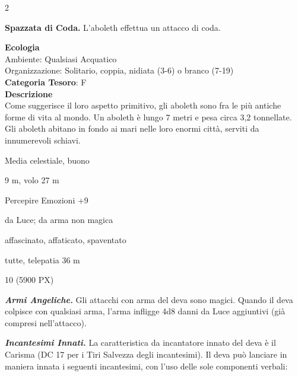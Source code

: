 \begin{multicols}{2}
{\textbf{Spazzata di Coda.} L'aboleth effettua un attacco di coda.

\textbf{Ecologia}\\
Ambiente: Qualsiasi Acquatico\\
Organizzazione: Solitario, coppia, nidiata (3-6) o branco (7-19)\\
\textbf{Categoria Tesoro}: F\\
\textbf{Descrizione}\\
Come suggerisce il loro aspetto primitivo, gli aboleth sono fra le più antiche forme di vita al mondo. Un aboleth è lungo 7 metri e pesa circa 3,2 tonnellate. Gli aboleth abitano in fondo ai mari nelle loro enormi città, serviti da innumerevoli schiavi.

\begin{description}[noitemsep, topsep=0pt, parsep=0pt, partopsep=0pt, itemsep=1pt, leftmargin=2.35cm,  labelwidth=2.2cm, itemindent=0cm, listparindent=0pt] %
\setlength{\baselineskip}{10pt}
\item[\textbf{Taglia/Tipo}] Media celestiale, buono
\item[\textbf{Caratt.}] 
\item[\textbf{Punti Ferita}] 
\item[\textbf{Movimento}] 9 m, volo 27 m
\item[\textbf{Tiri Salvez.}] 
\item[\textbf{Comp.}] Percepire Emozioni +9
\item[\textbf{Res. Danni}] da Luce; da arma non magica
\item[\textbf{Immunità}] affascinato, affaticato, spaventato
\item[\textbf{Sensi}] 
\item[\textbf{Linguaggi}] tutte, telepatia 36 m
\item[\textbf{Sfida}] 10 (5900 PX)
\end{description}
\smallskip

\emph{\textbf{Armi Angeliche.}} Gli attacchi con arma del deva sono magici. Quando il deva colpisce con qualsiasi arma, l'arma infligge 4d8 danni da Luce aggiuntivi (già compresi nell'attacco).

\emph{\textbf{Incantesimi Innati.}} La caratteristica da incantatore innato del deva è il Carisma (DC 17 per i Tiri Salvezza degli incantesimi). Il deva può lanciare in maniera innata i seguenti incantesimi, con l'uso delle sole componenti verbali:

}
\end{multicols}
